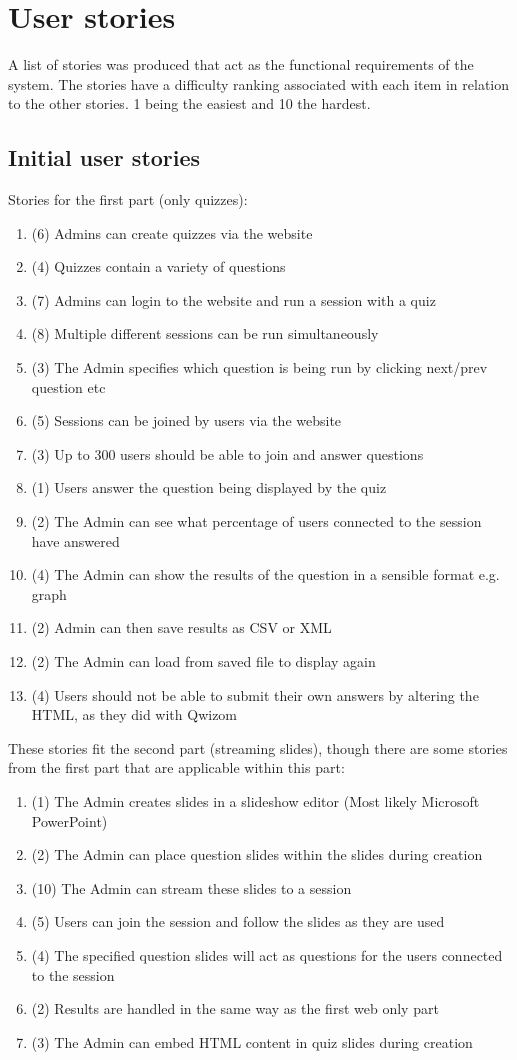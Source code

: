 \chapter{User stories}
A list of stories was produced that act as the functional requirements of the system. The stories have a difficulty ranking associated with each item in relation to the other stories. 1 being the easiest and 10 the hardest.

\section{Initial user stories}
\label{appendix:initial-stories}
Stories for the first part (only quizzes):
\begin{enumerate}
	\item (6) Admins can create quizzes via the website
	\item (4) Quizzes contain a variety of questions
	\item (7) Admins can login to the website and run a session with a quiz
	\item (8) Multiple different sessions can be run simultaneously
	\item (3) The Admin specifies which question is being run by clicking next/prev question etc
	\item (5) Sessions can be joined by users via the website
	\item (3) Up to 300 users should be able to join and answer questions
	\item (1) Users answer the question being displayed by the quiz
	\item (2) The Admin can see what percentage of users connected to the session have answered
	\item (4) The Admin can show the results of the question in a sensible format e.g. graph
	\item (2) Admin can then save results as CSV or XML
	\item (2) The Admin can load from saved file to display again
	\item (4) Users should not be able to submit their own answers by altering the HTML, as they did with Qwizom
\end{enumerate}
These stories fit the second part (streaming slides), though there are some stories from the first part that are applicable within this part:
\begin{enumerate}
	\item (1) The Admin creates slides in a slideshow editor (Most likely Microsoft PowerPoint)
	\item (2) The Admin can place question slides within the slides during creation
	\item (10) The Admin can stream these slides to a session
	\item (5) Users can join the session and follow the slides as they are used	
	\item (4) The specified question slides will act as questions for the users connected to the session
	\item (2) Results are handled in the same way as the first web only part
	\item (3) The Admin can embed HTML content in quiz slides during creation
\end{enumerate}
